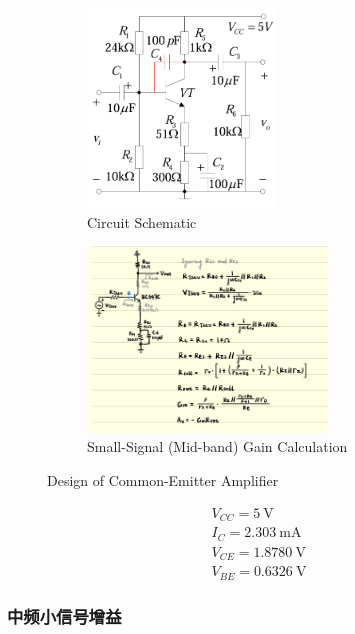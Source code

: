 \documentclass[UTF8]{article}
\begin{document}
\begin{center}
\noindent\begin{minipage}{0.74\columnwidth}
    \begin{figure}[H]\centering
        \begin{subfigure}[b]{0.5\columnwidth}\centering
            \includegraphics[height=150pt]{preview/assets/CE.png}
            \caption{Circuit Schematic}
        \end{subfigure}\hfill
        \begin{subfigure}[b]{0.5\columnwidth}\centering
            \includegraphics[height=140pt]{preview/assets/Gain.png}
            \caption{Small-Signal (Mid-band) Gain Calculation}
        \end{subfigure}
        \caption{Design of Common-Emitter Amplifier}
    \end{figure}
\end{minipage}\hfill\begin{minipage}{0.25\columnwidth}
    \begin{gather}
        V_{CC} = 5 \ \mathrm{V}\\
        I_C = 2.303\ \mathrm{mA}    \\
        V_{CE} = 1.8780\ \mathrm{V}  \\
        V_{BE} = 0.6326\ \mathrm{V}
    \end{gather}
\end{minipage}\end{center}

\subsubsection{中频小信号增益}
\end{document}
